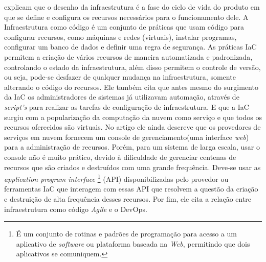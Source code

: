  explicam que o desenho da infraestrutura é a fase do ciclo de vida do produto em que se define e configura os recursos necessários para o funcionamento dele. A Infraestrutura como código é um conjunto de práticas que usam código para configurar recursos, como máquinas e redes (virtuais), instalar programas, configurar um banco de dados e definir uma regra de segurança. As práticas IaC permitem a criação de vários recursos de maneira automatizada e padronizada, controlando o estado da infraestrutura, além disso permitem o controle de versão, ou seja, pode-se desfazer de qualquer mudança na infraestrutura, somente alterando o código do recursos. Ele também cita que antes mesmo do surgimento da IaC os administradores de sistemas já utilizavam automação, através de \textit{script's} para realizar as tarefas de configuração de infraestrutura. E que a IaC surgiu com a popularização da computação da nuvem como serviço e que todos os recursos oferecidos são virtuais. No artigo ele ainda descreve que os provedores de serviços em nuvem fornecem um console de gerenciamento(uma interface \textit{web}) para a administração de recursos. Porém, para um sistema de larga escala, usar o console não é muito prático, devido à dificuldade de gerenciar centenas de recursos que são criados e destruídos com uma grande frequência. Deve-se usar as \textit{application program interface} \footnote{É um conjunto de rotinas e padrões de programação para acesso a um aplicativo de \textit{software} ou plataforma baseada na \textit{Web}, permitindo que dois aplicativos se comuniquem. } (API) disponibilizadas pelo provedor ou ferramentas IaC que interagem com essas API que resolvem a questão da criação e destruição de alta frequência desses recursos. Por fim, ele cita a relação entre infraestrutura como código \textit{Agile} e o DevOps. 

\hfill


